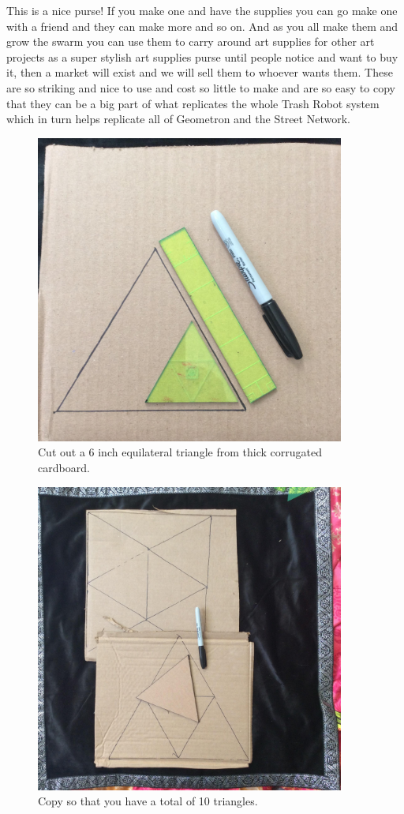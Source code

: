 This is a nice purse! If you make one and have the supplies you can go make one with a friend and they can make more and so on.  And as you all make them and grow the swarm you can use them to carry around art supplies for other art projects as a super stylish art supplies purse until people notice and want to buy it, then a market will exist and we will sell them to whoever wants them.  These are so striking and nice to use and cost so little to make and are so easy to copy that they can be a big part of what replicates the whole Trash Robot system which in turn helps replicate all of Geometron and the Street Network.


\begin{figure}
	\centering
	\includegraphics[width=4in]{figures/artboxtriangle.jpg}
	\caption[artboxtriangle]
	{Cut out a 6 inch equilateral triangle from thick corrugated cardboard.}
\end{figure}

\begin{figure}
	\centering
	\includegraphics[width=4in]{figures/artboxtriangleset.jpg}
	\caption[artboxtriangle]
	{Copy so that you have a total of 10 triangles.}
\end{figure}

